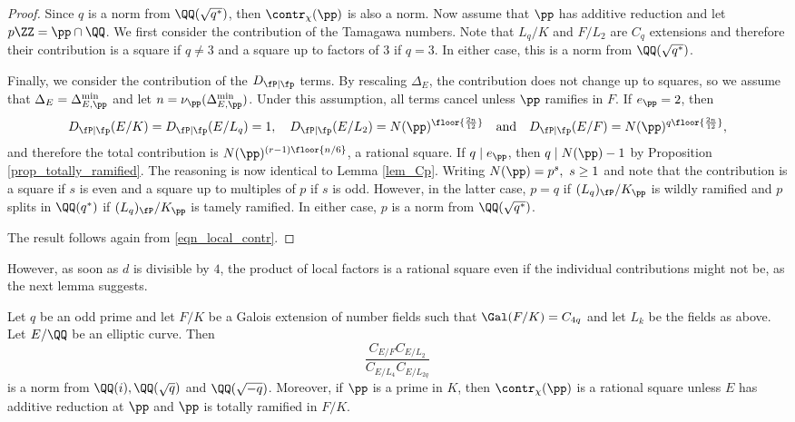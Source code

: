 \begin{proof}
    Since $q$ is a norm from $\QQ(\sqrt{q^*})$, then $\contr_\chi(\pp)$ is also a norm. Now assume that $\pp$ has additive reduction and let $p\ZZ=\pp\cap\QQ$. We first consider the contribution of the Tamagawa numbers. Note that $L_q/K$ and $F/L_2$ are $C_q$ extensions and therefore their contribution is a square if $q\neq 3$ and a square up to factors of $3$ if $q=3$. In either case, this is a norm from $\QQ(\sqrt{q^*})$.

    Finally, we consider the contribution of the $D_{\fP\mid\fp}$ terms. By rescaling $\Delta_E$, the contribution does not change up to squares, so we assume that $\Delta_E=\Delta_{E,\pp}^{\min}$ and let $n=\nu_\pp(\Delta_{E,\pp}^{\min})$. Under this assumption, all terms cancel unless $\pp$ ramifies in $F$. If $e_\pp=2$, then 
    \begin{equation}\label{eqn_ep=2}
        D_{\fP\mid\fp}(E/K)=D_{\fP\mid\fp}(E/L_q)=1,\quad D_{\fP\mid\fp}(E/L_2)=N(\pp)^{\floor{\frac{2n}{12}}}\quad\text{and}\quad D_{\fP\mid\fp}(E/F)=N(\pp)^{q\floor{\frac{2n}{12}}},
    \end{equation}
    and therefore the total contribution is $N(\pp)^{(r-1)\floor{n/6}}$, a rational square. If $q\mid e_\pp$, then $q\mid N(\pp)-1$ by Proposition \ref{prop_totally_ramified}. The reasoning is now identical to Lemma \ref{lem_Cp}. Writing $N(\pp)=p^s,\ s\geq1$ and note that the contribution is a square if $s$ is even and a square up to multiples of $p$ if $s$ is odd. However, in the latter case, $p=q$ if $(L_q)_\fP/K_\pp$ is wildly ramified and $p$ splits in $\QQ(q^*)$ if $(L_q)_\fP/K_\pp$ is tamely ramified. In either case, $p$ is a norm from $\QQ(\sqrt{q^*})$.   

    The result follows again from \eqref{eqn_local_contr}.

\end{proof}

However, as soon as $d$ is divisible by $4$, the product of local factors is a rational square even if the individual contributions might not be, as the next lemma suggests. 

\begin{lemma}\label{lem_C4p}
    Let $q$ be an odd prime and let $F/K$ be a Galois extension of number fields such that $\Gal(F/K)=C_{4q}$ and let $L_k$ be the fields as above. Let $E/\QQ$ be an elliptic curve. Then
    $$\frac{C_{E/F}C_{E/L_2}}{C_{E/L_4}C_{E/L_{2q}}}$$
    is a norm from $\QQ(i),\QQ(\sqrt{q})$ and $\QQ(\sqrt{-q})$. Moreover, if $\pp$ is a prime in $K$, then $\contr_\chi(\pp)$ is a rational square unless $E$ has additive reduction at $\pp$ and $\pp$ is totally ramified in $F/K$.
\end{lemma}

